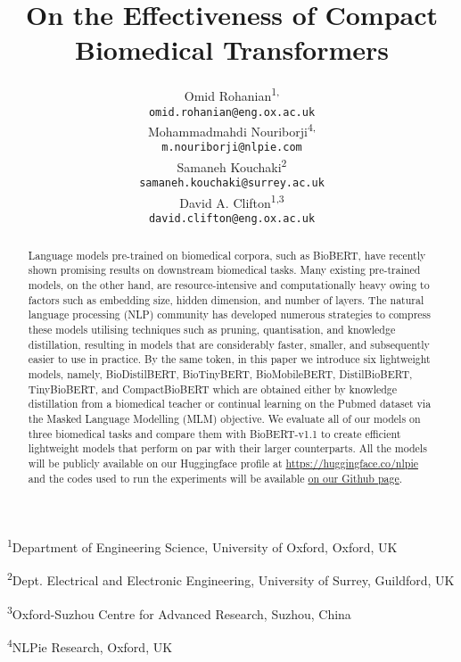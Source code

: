 \documentclass{article}
\title{On the Effectiveness of Compact Biomedical Transformers}
\author{Omid Rohanian\textsuperscript{1,} \\
  \texttt{omid.rohanian@eng.ox.ac.uk} \\
\And
   Mohammadmahdi Nouriborji\textsuperscript{4,} \\
   \texttt{m.nouriborji@nlpie.com} \\
   \AND
   Samaneh Kouchaki\textsuperscript{2} \\
   \texttt{samaneh.kouchaki@surrey.ac.uk} \\
   \And
   David A. Clifton\textsuperscript{1,3} \\
   \texttt{david.clifton@eng.ox.ac.uk} \\
}
\begin{document}
\maketitle

\def\thefootnote{}
\def\thefootnote{\arabic{footnote}}

\begin{center}

\textsuperscript{1}Department of Engineering Science, University of Oxford, Oxford, UK

\textsuperscript{2}Dept. Electrical and Electronic Engineering, University of Surrey, Guildford, UK

\textsuperscript{3}Oxford-Suzhou Centre for Advanced Research, Suzhou, China

\textsuperscript{4}NLPie Research, Oxford, UK 

\end{center}

\begin{abstract}
  Language models pre-trained on biomedical corpora, such as BioBERT, have recently shown promising results on downstream biomedical tasks. Many existing pre-trained models, on the other hand, are resource-intensive and computationally heavy owing to factors such as embedding size, hidden dimension, and number of layers. The natural language processing (NLP) community has developed numerous strategies to compress these models utilising techniques such as pruning, quantisation, and knowledge distillation, resulting in models that are considerably faster, smaller, and subsequently easier to use in practice. By the same token, in this paper we introduce six lightweight models, namely, BioDistilBERT, BioTinyBERT, BioMobileBERT, DistilBioBERT, TinyBioBERT, and CompactBioBERT which are obtained either by knowledge distillation from a biomedical teacher or continual learning on the Pubmed dataset via the Masked Language Modelling (MLM) objective. We evaluate all of our models on three biomedical tasks and compare them with BioBERT-v1.1 to create efficient lightweight models that perform on par with their larger counterparts. All the models will be publicly available on our Huggingface profile at \url{https://huggingface.co/nlpie} and the codes used to run the experiments will be available \href{https://github.com/nlpie-research/Compact-Biomedical-Transformers}{on our Github page}.  

\end{abstract}
\end{document}
